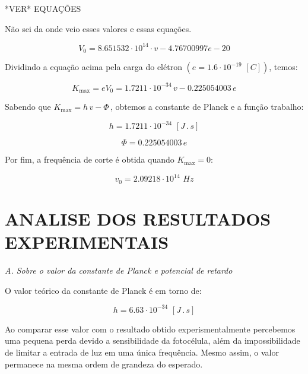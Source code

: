 \documentclass[10pt,twocolumn,letterpaper]{article}
\begin{document}
{\Huge \color{red} *VER* EQUAÇÕES}

{\color{red} Não sei da onde veio esses valores e essas equações.}

\begin{equation*}
    V_0 = 8.651532\cdot 10^{14} \cdot v - 4.76700997e-20
\end{equation*}

\hspace{1cm} Dividindo a equação acima pela carga do elétron $(e =
1.6 \cdot 10^{-19} \,\, [C])$, temos:

\begin{equation*}
    K_{\max} = eV_0 = 1.7211 \cdot 10^{-34}\,v - 0.225054003\,e
\end{equation*}

\hspace{1cm} Sabendo que $K_{\max} = h\,v - \Phi\,$, obtemos a constante de
Planck e a função trabalho:

\begin{equation*}
    h = 1.7211\cdot 10^{-34} \,\, [J\,.\,s]
\end{equation*}

\begin{equation*}
    \Phi = 0.225054003\,e
\end{equation*}

\noindent Por fim, a frequência de corte é obtida quando $K_{\max} = 0$:

\begin{equation*}
    v_0 = 2.09218 \cdot 10^{14} \,\, Hz
\end{equation*}


\section{ANALISE DOS RESULTADOS EXPERIMENTAIS}

\noindent\textit{A. Sobre o valor da constante de Planck e potencial de
retardo}

\noindent O valor teórico da constante de Planck é em torno de:

\begin{equation*}
    h = 6.63 \cdot 10^{-34} \,\, [J\,.\,s]
\end{equation*}

\hspace{1cm} Ao comparar esse valor com o resultado obtido experismentalmente percebemos uma pequena perda devido a sensibilidade da fotocélula, além da impossibilidade de limitar a entrada de luz em uma única frequência. Mesmo assim, o valor permanece na mesma ordem de grandeza do esperado.
\end{document}
